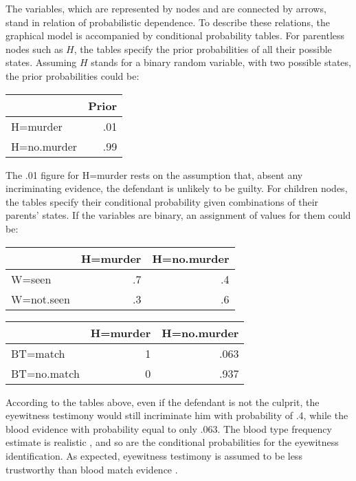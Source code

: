 \documentclass{article}
\begin{document}
The variables, which are represented by nodes and are connected by arrows, stand in relation of probabilistic dependence. To describe these relations, 
the graphical model is accompanied by conditional probability tables. %
For parentless nodes such as $H$, the tables specify 
the prior probabilities of all their possible states. Assuming $H$ stands for a binary random variable, with two possible states, 
the prior probabilities 
could be:
\begin{table}[H]
\centering
\begin{tabular}{lr}
\toprule
  & Prior\\
\midrule
H=murder & .01\\
H=no.murder & .99\\
\bottomrule
\end{tabular}
\end{table}
\noindent
The .01 figure for H=murder rests on the assumption that, absent any incriminating evidence, the defendant is unlikely to be guilty. For children nodes, the tables specify their conditional probability given combinations of their parents' states.  If the variables are  binary, an assignment of values for them could be:
\begin{table}[H]
\centering
\begin{tabular}{lrr}
\toprule
  & H=murder & H=no.murder\\
\midrule
W=seen & .7 & .4\\
W=not.seen & .3 & .6\\
\bottomrule
\end{tabular}
\end{table}

\begin{table}[H]
\centering
\begin{tabular}{lrr}
\toprule
  & H=murder & H=no.murder\\
\midrule
BT=match & 1 & .063\\
BT=no.match & 0 & .937\\
\bottomrule
\end{tabular}
\end{table}
\noindent
According to the tables above, even if the defendant is not the culprit, the eyewitness testimony would still incriminate him with  probability of .4, while the blood evidence with  probability equal to only .063. The blood type frequency estimate is realistic \citep[141]{lucy2013introduction}, and so are the conditional probabilities for the eyewitness identification. 
As expected, eyewitness testimony is assumed to be less trustworthy than blood match evidence  \citep[but for complications about assessing eyewitness testimony, see][]{wixted2017RelationshipEyewitnessConfidence, Urbaniak2020Decision}.
\end{document}
